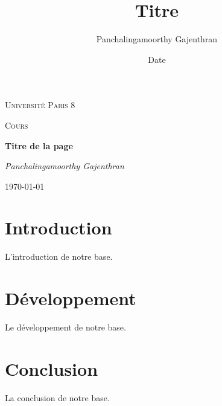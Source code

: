 \documentclass[12pt,a4paper]{article}
\title{Titre}
\author{Panchalingamoorthy Gajenthran}
\date{Date}
\begin{document}
\begin{titlepage}
	\centering
	{\scshape\LARGE Université Paris 8 \par}
	\vspace{1cm}
	{\scshape\Large Cours \par}
	\vspace{4.5cm}
	{\huge\bfseries Titre de la page\par}
	\vspace{1cm}
	{\Large\itshape Panchalingamoorthy Gajenthran \par}
	\vfill
	
	{\large \today\par}
\end{titlepage}

\tableofcontents

     

\section{Introduction} 
L'introduction de notre base.
     
\section{Développement} 
Le développement de notre base.

\section{Conclusion} 
La conclusion de notre base.
\end{document}

